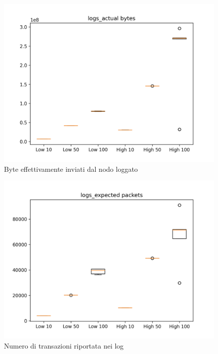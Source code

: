 \documentclass[12pt, a4paper]{article}
\begin{document}
\begin{figure}[H]
    \includegraphics[width=\linewidth, height=0.4\textheight, keepaspectratio]{graphs/logs_actual bytes.png}
    \caption{Byte effettivamente inviati dal nodo loggato}
    \label{fig:lab}
\end{figure}

\begin{figure}[H]
    \includegraphics[width=\linewidth, height=0.4\textheight, keepaspectratio]{graphs/logs_expected packets.png}
    \caption{Numero di transazioni riportata nei log}
    \label{fig:lep}
\end{figure}
\end{document}
